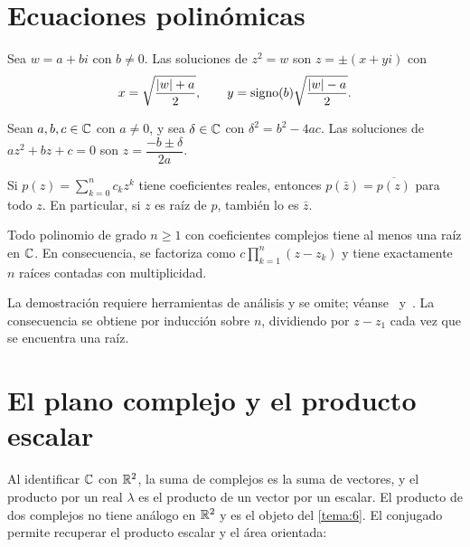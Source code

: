 \section{Ecuaciones polinómicas}

\begin{proposicion}\label{prop:raiz-cuadrada}
Sea $w=a+bi$ con $b\ne0$. Las soluciones de $z^{2}=w$ son $z=\pm(x+yi)$ con
\[
x=\sqrt{\frac{\lvert w\rvert+a}{2}},\qquad y=\operatorname{signo}(b)\sqrt{\frac{\lvert w\rvert-a}{2}} .
\]
\end{proposicion}

\addtocounter{definicion}{1}%

\begin{proposicion}\label{prop:cuadratica}
Sean $a,b,c\in\mathbb{C}$ con $a\ne0$, y sea $\delta\in\mathbb{C}$ con $\delta^{2}=b^{2}-4ac$. Las soluciones de $az^{2}+bz+c=0$ son $z=\dfrac{-b\pm\delta}{2a}$.
\end{proposicion}

\begin{proposicion}\label{prop:conjugadas}
Si $p(z)=\sum_{k=0}^{n}c_kz^{k}$ tiene coeficientes reales, entonces $p(\bar z)=\overline{p(z)}$ para todo $z$. En particular, si $z$ es raíz de $p$, también lo es $\bar z$.
\end{proposicion}

\begin{teorema}\label{teo:fundamental}
Todo polinomio de grado $n\ge1$ con coeficientes complejos tiene al menos una raíz en $\mathbb{C}$. En consecuencia, se factoriza como $c\prod_{k=1}^{n}(z-z_k)$ y tiene exactamente $n$ raíces contadas con multiplicidad.
\end{teorema}

La demostración requiere herramientas de análisis y se omite; véanse~\cite[§5.3]{mit1803} y~\cite{needham}. La consecuencia se obtiene por inducción sobre $n$, dividiendo por $z-z_1$ cada vez que se encuentra una raíz.

\section{El plano complejo y el producto escalar}

\addtocounter{figure}{1}%

Al identificar $\mathbb{C}$ con $\mathbb{R}^{2}$, la suma de complejos es la suma de vectores, y el producto por un real $\lambda$ es el producto de un vector por un escalar. El producto de dos complejos no tiene análogo en $\mathbb{R}^{2}$ y es el objeto del \cref{tema:6}. El conjugado permite recuperar el producto escalar y el área orientada:

